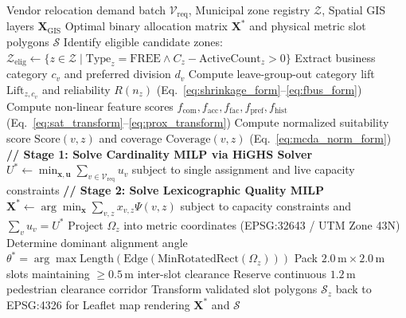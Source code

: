 \begin{algorithm}[htbp]
\caption{End-to-End VendorMap Relocation and Micro-Allocation Pipeline}
\label{alg:vendormap_pipeline}
\begin{algorithmic}[1]
\Require Vendor relocation demand batch $\mathcal{V}_{\text{req}}$, Municipal zone registry $\mathcal{Z}$, Spatial GIS layers $\mathbf{X}_{\text{GIS}}$
\Ensure Optimal binary allocation matrix $\mathbf{X}^*$ and physical metric slot polygons $\mathcal{S}$
\State Identify eligible candidate zones: $\mathcal{Z}_{\text{elig}} \gets \{z \in \mathcal{Z} \mid \text{Type}_z = \text{FREE} \land C_z - \text{ActiveCount}_z > 0\}$
    \State Extract business category $c_v$ and preferred division $d_v$
        \State Compute leave-group-out category lift $\text{Lift}_{z,c_v}$ and reliability $R(n_z)$ (Eq.~\ref{eq:shrinkage_form}--\ref{eq:fbus_form})
        \State Compute non-linear feature scores $f_{\text{com}}, f_{\text{acc}}, f_{\text{fac}}, f_{\text{pref}}, f_{\text{hist}}$ (Eq.~\ref{eq:sat_transform}--\ref{eq:prox_transform})
        \State Compute normalized suitability score $\text{Score}(v,z)$ and coverage $\text{Coverage}(v,z)$ (Eq.~\ref{eq:mcda_norm_form})
    \EndFor
\EndFor
\State \textbf{// Stage 1: Solve Cardinality MILP via HiGHS Solver}
\State $U^* \gets \min_{\mathbf{x}, \mathbf{u}} \sum_{v \in \mathcal{V}_{\text{req}}} u_v$ subject to single assignment and live capacity constraints
\State \textbf{// Stage 2: Solve Lexicographic Quality MILP}
\State $\mathbf{X}^* \gets \arg\min_{\mathbf{x}} \sum_{v,z} x_{v,z} \Psi(v, z)$ subject to capacity constraints and $\sum_v u_v = U^*$
    \State Project $\Omega_z$ into metric coordinates (EPSG:32643 / UTM Zone 43N)
    \State Determine dominant alignment angle $\theta^* = \arg\max \text{Length}(\text{Edge}(\text{MinRotatedRect}(\Omega_z)))$
    \State Pack $2.0\,\text{m} \times 2.0\,\text{m}$ slots maintaining $\ge 0.5\,\text{m}$ inter-slot clearance
    \State Reserve continuous $1.2\,\text{m}$ pedestrian clearance corridor
    \State Transform validated slot polygons $\mathcal{S}_z$ back to EPSG:4326 for Leaflet map rendering
\EndFor
\State \Return $\mathbf{X}^*$ and $\mathcal{S}$
\end{algorithmic}
\end{algorithm}
